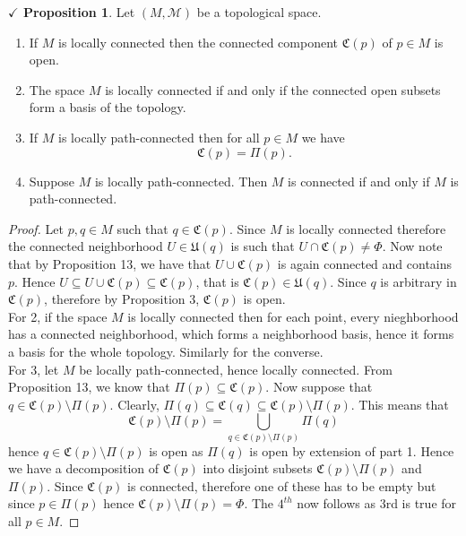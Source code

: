 \documentclass{article}
\newcommand{\notset}[0]{\setminus}
\theoremstyle{definition}
\theoremstyle{remark}
\theoremstyle{definition}
\theoremstyle{definition}
\newtheorem{proposition}{$\checkmark$ Proposition}
\newcommand{\topo}[1]{\mathcal{#1}}
\newcommand{\nbdsys}[2]{\mathfrak{#1}(#2)}
\newcommand{\conncomp}[1]{\mathfrak{C}(#1)}
\newcommand{\pathconncomp}[1]{\Pi(#1)}
\newcommand{\union}[0]{\cup}
\newcommand{\intrs}[0]{\cap}
\newcommand{\bunion}[0]{\bigcup}
\begin{document}
\hrulefill
\begin{proposition}
	Let $ (M,\topo{M}) $ be a topological space.
	\begin{enumerate}
		\item{If $ M $ is locally connected then the connected component $ \conncomp{p} $ of $ p\in M $ is open.}
		\item{The space $ M $ is locally connected if and only if the connected open subsets form a basis of the topology.}
		\item{If $ M $ is locally path-connected then for all $ p\in M $ we have
	\[\conncomp{p} = \pathconncomp{p}.\]	
	}
\item{Suppose $ M $ is locally path-connected. Then $ M $ is connected if and only if $ M $ is path-connected.}
	\end{enumerate}
\end{proposition}
\begin{proof}
	Let $ p,q \in M $ such that $ q \in \conncomp{p} $. Since $ M $ is locally connected therefore the connected neighborhood $ U \in \nbdsys{U}{q} $ is such that $ U \intrs\conncomp{p} \neq \Phi$. Now note that by Proposition 13, we have that $ U \union \conncomp{p} $ is again connected and contains $ p $. Hence $ U \subseteq U \union \conncomp{p}\subseteq \conncomp{p} $, that is $ \conncomp{p} \in \nbdsys{U}{q}$. Since $ q $ is arbitrary in $ \conncomp{p} $, therefore by Proposition 3, $ \conncomp{p} $ is open.\\
	For 2, if the space $ M $ is locally connected then for each point, every nieghborhood has a connected neighborhood, which forms a neighborhood basis, hence it forms a basis for the whole topology. Similarly for the converse.\\
	For 3, let $ M $ be locally path-connected, hence locally connected. From Proposition 13, we know that $ \pathconncomp{p} \subseteq \conncomp{p} $. Now suppose that $ q \in \conncomp{p} \notset \pathconncomp{p} $. Clearly, $ \pathconncomp{q} \subseteq \conncomp{q} \subseteq \conncomp{p} \notset \pathconncomp{p} $. This means that 
	\[ \conncomp{p} \notset \pathconncomp{p} = \bunion_{q \in \conncomp{p} \notset \pathconncomp{p} } \pathconncomp{q}\]
	hence $ q \in \conncomp{p} \notset \pathconncomp{p}  $ is open as $ \pathconncomp{q} $ is open by extension of part 1. Hence we have a decomposition of $ \conncomp{p} $ into disjoint subsets $ \conncomp{p} \notset \pathconncomp{p}$ and $ \pathconncomp{p} $. Since $ \conncomp{p} $ is connected, therefore one of these has to be empty but since $ p \in \pathconncomp{p} $ hence $ \conncomp{p} \notset \pathconncomp{p} = \Phi$. The $ 4^{th} $ now follows as 3rd is true for all $ p\in M $.
\end{proof} 
\hrulefill
\newpage
\end{document}
